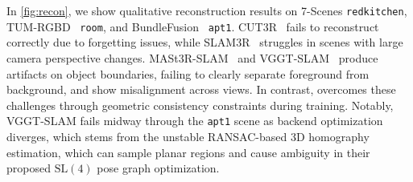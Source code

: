 In \cref{fig:recon}, we show qualitative reconstruction results on 7-Scenes \texttt{redkitchen}, TUM-RGBD~\cite{sturm12tumrgbd} \texttt{room}, and BundleFusion~\cite{dai2017bundlefusion} \texttt{apt1}. CUT3R~\cite{wang2025cut3r} fails to reconstruct correctly due to forgetting issues, while SLAM3R~\cite{liu2025slam3r} struggles in scenes with large camera perspective changes. MASt3R-SLAM~\cite{murai2025mast3rslam} and VGGT-SLAM~\cite{maggio2025vggtslam} produce artifacts on object boundaries, failing to clearly separate foreground from background, and show misalignment across views. In contrast, \ours overcomes these challenges through geometric consistency constraints during training. Notably, VGGT-SLAM fails midway through the \texttt{apt1} scene as backend optimization diverges, which stems from the unstable RANSAC-based 3D homography estimation, which can sample planar regions and cause ambiguity in their proposed $\mathrm{SL}(4)$ pose graph optimization.
